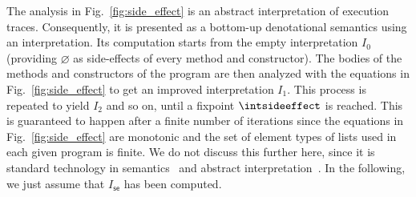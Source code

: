 The analysis in Fig.~\ref{fig:side_effect} is an abstract interpretation of execution traces.
Consequently, it is presented as a bottom-up denotational semantics using an interpretation.
Its computation starts from the empty interpretation $I_0$ (providing $\varnothing$ as
side-effects of every method and constructor). The bodies of the methods and constructors
of the program are then analyzed with the equations
in Fig.~\ref{fig:side_effect} to get an improved interpretation $I_1$.
This process is repeated to yield $I_2$ and so on, until a fixpoint $\intsideeffect$
is reached. This is guaranteed to happen after a finite number of iterations
since the equations in Fig.~\ref{fig:side_effect} are monotonic and the set of element types
of lists used in each given program is finite.
We do not discuss this further here, since it is standard technology in semantics~\cite{Winskel93}
and abstract interpretation~\cite{CousotC77}. In the following, we just assume that $I_\mathsf{se}$ has been computed.

